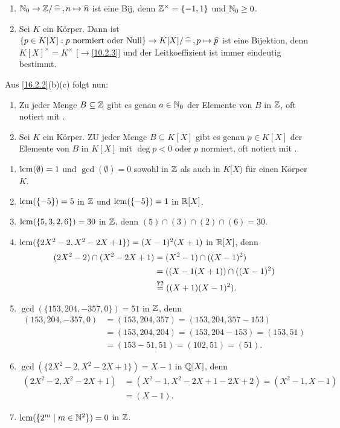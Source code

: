 \documentclass[../../main.tex]{subfiles}
\begin{document}
\begin{bsp}\label{16.2.5}
\begin{enumerate}[\normalfont(a)]
\item $\mathbb N_0\to \mathbb Z/\,\widehat{=}\,, n\mapsto \widehat{n}$ ist eine Bij, denn $\mathbb Z^\times=\{-1,1\}$ und $\mathbb N_0\ge 0$.
\item Sei $K$ ein Körper. Dann ist $\{p\in K[X]: p\text{ normiert oder Null}\}\to K[X]/\,\widehat{=}\,, p\mapsto \widehat{p}$ ist eine Bijektion, denn $K[X]^\times=K^\times$ [$\to$\ref{10.2.3}] und der Leitkoeffizient ist immer eindeutig bestimmt.
\end{enumerate}
\end{bsp}

\begin{bem}\label{16.2.6}
Aus \ref{16.2.2}(b)(c) folgt nun:
\begin{enumerate}[\normalfont]
\item Zu jeder Menge $B\subseteq \mathbb Z$ gibt es genau  $a\in \mathbb N_0$ der Elemente von $B$ in $\mathbb Z$, oft notiert mit .
\item Sei $K$ ein Körper. ZU jeder Menge $B\subseteq K[X]$ gibt es genau  $p\in K[X]$ der Elemente von $B$ in $K[X]$ mit $\deg p<0$ oder $p$ normiert, oft notiert mit .
\end{enumerate}
\end{bem}

\begin{bsp}\label{16.2.7}
\begin{enumerate}[\normalfont(a)]
\item $\operatorname{lcm}(\emptyset)=1$ und $\gcd(\emptyset)=0$ sowohl in $\mathbb Z$ als auch in $K[X)$ für einen Körper $K$.
\item $\operatorname{lcm}(\{-5\})=5$ in $\mathbb Z$ und $\operatorname{lcm}(\{-5\})=1$ in $\mathbb R[X]$.
\item $\operatorname{lcm}(\{5,3,2,6\})=30$ in $\mathbb Z$, denn $(5)\cap(3)\cap(2)\cap(6)=30$.
\item $\operatorname{lcm}(\{2X^2-2,X^2-2X+1\})=(X-1)^2(X+1)$ in $\mathbb R[X]$, denn
\begin{align*}
(2X^2-2)\cap (X^2-2X+1)&=(X^2-1)\cap ((X-1)^2)\\
&=((X-1(X+1))\cap((X-1)^2)\\
&\stackrel{\Ref{4.2.10}}{=}((X+1)(X-1)^2).
\end{align*}
\item $\gcd(\{153,204,-357,0\})=51$ in $\mathbb Z$, denn
\begin{align*}
(153,204,-357,0)&=(153,204,357)=(153,204,357-153)\\
&=(153,204,204)=(153,204-153)=(153,51)\\
&=(153-51,51)=(102,51)=(51).
\end{align*}
\item $\gcd(\{2X^2-2,X^2-2X+1\})=X-1$ in $\mathbb Q[X]$, denn
\begin{align*}
(2X^2-2,X^2-2X+1)&=(X^2-1,X^2-2X+1-2X+2)=(X^2-1,X-1)\\
&=(X-1).
\end{align*}
\item $\operatorname{lcm}(\{2^m\mid m\in \mathbb N^2\})=0$ in $\mathbb Z$.
\end{enumerate}
\end{bsp}
\end{document}
